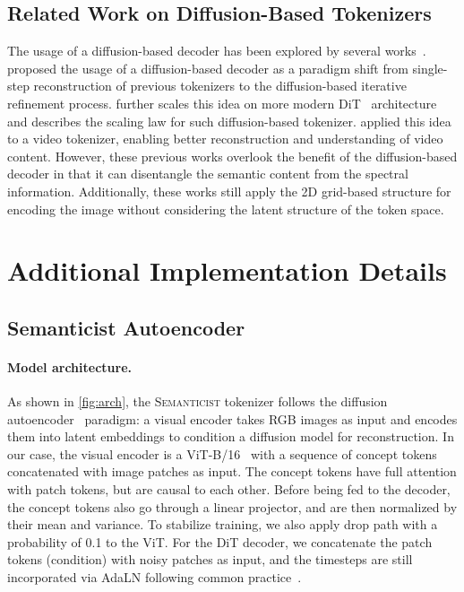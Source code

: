 \documentclass[10pt,twocolumn,letterpaper]{article}
\DeclareRobustCommand{\modelname}{\textsc{Semanticist}\xspace}
\begin{document}
\subsection{Related Work on Diffusion-Based Tokenizers}
The usage of a diffusion-based decoder has been explored by several works~\cite{evae,dito,ge2024divot}.
\cite{evae} proposed the usage of a diffusion-based decoder as a paradigm shift from single-step reconstruction of previous tokenizers to the diffusion-based iterative refinement process.
\cite{dito} further scales this idea on more modern DiT~\cite{dit} architecture and describes the scaling law for such diffusion-based tokenizer.
\cite{ge2024divot} applied this idea to a video tokenizer, enabling better reconstruction and understanding of video content.
However, these previous works overlook the benefit of the diffusion-based decoder in that it can disentangle the semantic content from the spectral information.
Additionally, these works still apply the 2D grid-based structure for encoding the image without considering the latent structure of the token space.

\section{Additional Implementation Details} \label{sec:impl_detail_ext}
\subsection{Semanticist Autoencoder}
\paragraph{Model architecture.}
As shown in \cref{fig:arch}, the \modelname tokenizer follows the diffusion autoencoder~\cite{diffae,RCG} paradigm: a visual encoder takes RGB images as input and encodes them into latent embeddings to condition a diffusion model for reconstruction. In our case, the visual encoder is a ViT-B/16~\cite{vit} with a sequence of concept tokens concatenated with image patches as input. The concept tokens have full attention with patch tokens, but are causal to each other. Before being fed to the decoder, the concept tokens also go through a linear projector, and are then normalized by their mean and variance. To stabilize training, we also apply drop path with a probability of 0.1 to the ViT.
For the DiT decoder, we concatenate the patch tokens (condition) with noisy patches as input, and the timesteps are still incorporated via AdaLN following common practice~\cite{dit}. 
\end{document}
